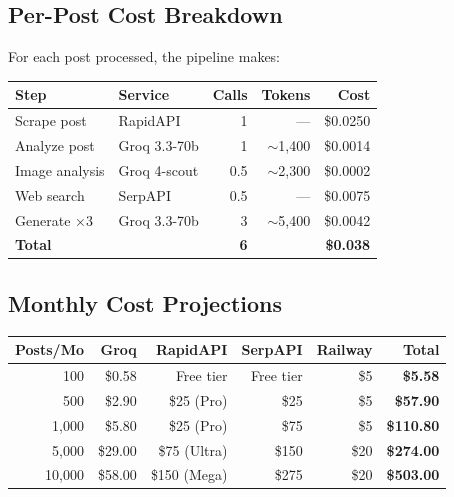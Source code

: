 \documentclass[12pt,a4paper]{article}
\begin{document}
\subsection{Per-Post Cost Breakdown}

For each post processed, the pipeline makes:

\begin{center}
\begin{tabularx}{\textwidth}{Xlrrr}
\toprule
\textbf{Step} & \textbf{Service} & \textbf{Calls} & \textbf{Tokens} & \textbf{Cost} \\
\midrule
Scrape post & RapidAPI & 1 & --- & \$0.0250 \\
Analyze post & Groq 3.3-70b & 1 & $\sim$1,400 & \$0.0014 \\
Image analysis & Groq 4-scout & 0.5 & $\sim$2,300 & \$0.0002 \\
Web search & SerpAPI & 0.5 & --- & \$0.0075 \\
Generate ×3 & Groq 3.3-70b & 3 & $\sim$5,400 & \$0.0042 \\
\midrule
\textbf{Total} & & \textbf{6} & & \textbf{\$0.038} \\
\bottomrule
\end{tabularx}
\end{center}

\subsection{Monthly Cost Projections}

\begin{center}
\renewcommand{\arraystretch}{1.3}
\begin{tabular}{|r|r|r|r|r|r|}
\hline
\textbf{Posts/Mo} & \textbf{Groq} & \textbf{RapidAPI} & \textbf{SerpAPI} & \textbf{Railway} & \textbf{Total} \\
\hline
100 & \$0.58 & Free tier & Free tier & \$5 & \textbf{\$5.58} \\
\hline
500 & \$2.90 & \$25 (Pro) & \$25 & \$5 & \textbf{\$57.90} \\
\hline
1,000 & \$5.80 & \$25 (Pro) & \$75 & \$5 & \textbf{\$110.80} \\
\hline
5,000 & \$29.00 & \$75 (Ultra) & \$150 & \$20 & \textbf{\$274.00} \\
\hline
10,000 & \$58.00 & \$150 (Mega) & \$275 & \$20 & \textbf{\$503.00} \\
\hline
\end{tabular}
\end{center}
\end{document}
